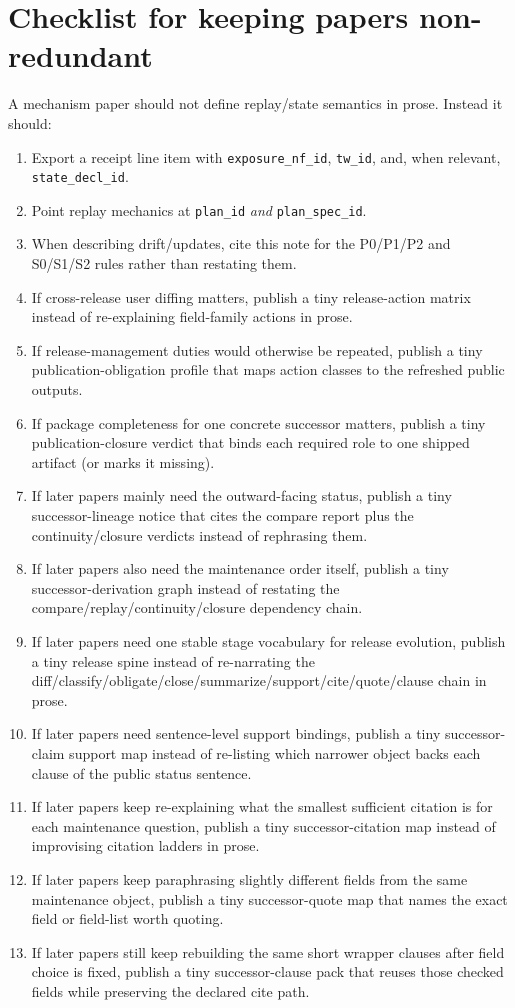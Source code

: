 \documentclass[11pt]{article}
\begin{document}
\section{Checklist for keeping papers non-redundant}
A mechanism paper should not define replay/state semantics in prose.
Instead it should:
\begin{enumerate}[leftmargin=*]
\item Export a receipt line item with \texttt{exposure\_nf\_id}, \texttt{tw\_id}, and, when relevant, \texttt{state\_decl\_id}.
\item Point replay mechanics at \texttt{plan\_id} \emph{and} \texttt{plan\_spec\_id}.
\item When describing drift/updates, cite this note for the P0/P1/P2 and S0/S1/S2 rules rather than restating them.
\item If cross-release user diffing matters, publish a tiny release-action matrix instead of re-explaining field-family actions in prose.
\item If release-management duties would otherwise be repeated, publish a tiny publication-obligation profile that maps action classes to the refreshed public outputs.
\item If package completeness for one concrete successor matters, publish a tiny publication-closure verdict that binds each required role to one shipped artifact (or marks it missing).
\item If later papers mainly need the outward-facing status, publish a tiny successor-lineage notice that cites the compare report plus the continuity/closure verdicts instead of rephrasing them.
\item If later papers also need the maintenance order itself, publish a tiny successor-derivation graph instead of restating the compare/replay/continuity/closure dependency chain.
\item If later papers need one stable stage vocabulary for release evolution, publish a tiny release spine instead of re-narrating the diff/classify/obligate/close/summarize/support/cite/quote/clause chain in prose.
\item If later papers need sentence-level support bindings, publish a tiny successor-claim support map instead of re-listing which narrower object backs each clause of the public status sentence.
\item If later papers keep re-explaining what the smallest sufficient citation is for each maintenance question, publish a tiny successor-citation map instead of improvising citation ladders in prose.
\item If later papers keep paraphrasing slightly different fields from the same maintenance object, publish a tiny successor-quote map that names the exact field or field-list worth quoting.
\item If later papers still keep rebuilding the same short wrapper clauses after field choice is fixed, publish a tiny successor-clause pack that reuses those checked fields while preserving the declared cite path.
\end{enumerate}
\end{document}
